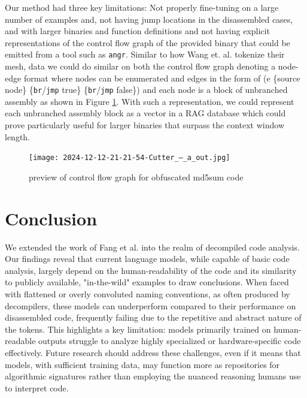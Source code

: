 Our method had three key limitations: Not properly fine-tuning on a large number of examples and, not having jump locations in the disassembled cases, and with larger binaries and function definitions and not
having explicit representations of the control flow graph of the provided
binary that could be emitted from a tool such as \verb|angr|. Similar to how Wang et. al. \cite{wang2024llamameshunifying3dmesh} tokenize their mesh, data we could do similar on both the control flow graph denoting a node-edge format where nodes can be enumerated and edges in the form of (e \{source node\} \{\verb|br|/\verb|jmp| true\} \{\verb|br|/\verb|jmp| false\}) and each node is a block of unbranched assembly as shown in Figure \ref{fig:cfg}. With such a representation, we could represent each unbranched assembly block as a vector in a RAG database which could prove particularly useful for larger binaries that surpass the context window length.



\begin{figure}
    \centering
    \texttt{[image: 2024-12-12-21-21-54-Cutter\_–\_a\_out.jpg]}
    \caption{preview of control flow graph for obfuscated md5sum code \cite{iocccilya}}
    \label{fig:cfg}
\end{figure}


\section{Conclusion}

We extended the work of Fang et al. \cite{fang2024large} into the realm of decompiled code analysis. Our findings reveal that current language models, while capable of basic code analysis, largely depend on the human-readability of the code and its similarity to publicly available, "in-the-wild" examples to draw conclusions. When faced with flattened or overly convoluted naming conventions, as often produced by decompilers, these models can underperform compared to their performance on disassembled code, frequently failing due to the repetitive and abstract nature of the tokens. This highlights a key limitation: models primarily trained on human-readable outputs struggle to analyze highly specialized or hardware-specific code effectively. Future research should address these challenges, even if it means that models, with sufficient training data, may function more as repositories for algorithmic signatures rather than employing the nuanced reasoning humans use to interpret code.
